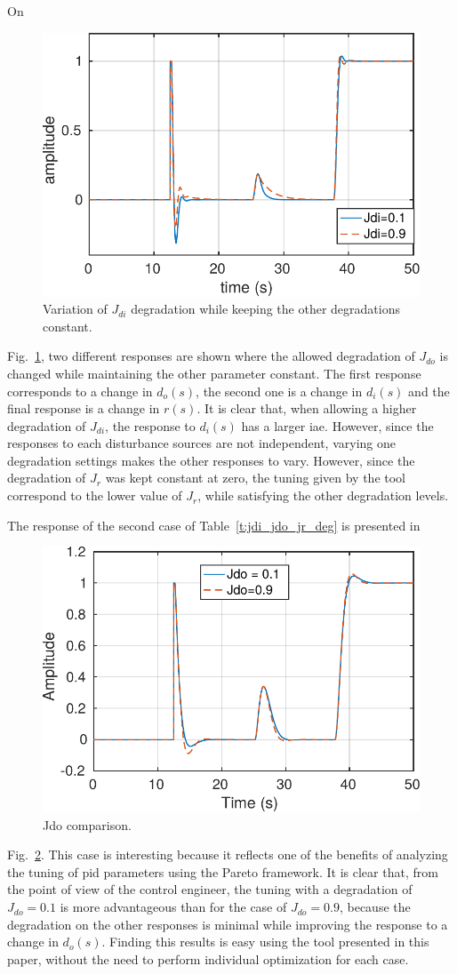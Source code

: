 On %
\begin{figure}
	\begin{center}
		\includegraphics[width=0.65\columnwidth]{figuras/jdi_comp}
		\caption{Variation of $J_{di}$ degradation while keeping the other degradations constant.}
		\label{f:jdi_comp}
	\end{center}
\end{figure}
Fig.~\ref{f:jdi_comp}, two different responses are shown where the allowed degradation of $J_{do}$ is changed while maintaining the other parameter constant. The first response corresponds to a change in $d_o(s)$, the second one is a change in $d_i(s)$ and the final response is a change in $r(s)$. It is clear that, when allowing a higher degradation of $J_{di}$, the response to $d_i(s)$ has a larger \gls{iae}. However, since the responses to each disturbance sources are not independent, varying one degradation settings makes the other responses to vary. However, since the degradation of $J_r$ was kept constant at zero, the tuning given by the tool correspond to the lower value of $J_r$, while satisfying the other degradation levels.

The response of the second case of Table~\ref{t:jdi_jdo_jr_deg} is presented in %
\begin{figure}
	\centering
	\includegraphics[width=0.65\columnwidth]{figuras/jdo_comp}
	\caption{Jdo comparison.}
	\label{f:jdo_comp}
\end{figure}
%
Fig.~\ref{f:jdo_comp}. This case is interesting because it reflects one of the benefits of analyzing the tuning of \gls{pid} parameters using the Pareto framework. It is clear that, from the point of view of the control engineer, the tuning with a degradation of $J_{do}=0.1$ is more advantageous than for the case of $J_{do}=0.9$, because the degradation on the other responses is minimal while improving the response to a change in $d_o(s)$. Finding this results is easy using the tool presented in this paper, without the need to perform individual optimization for each case.

